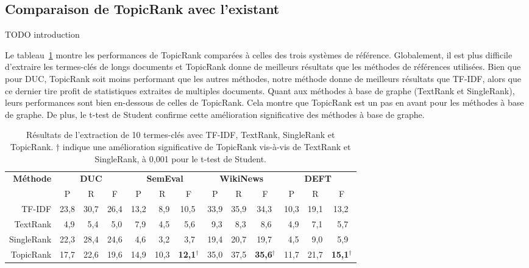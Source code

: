   \subsection{Comparaison de TopicRank avec l'existant}
  \label{subsec:comparaison_de_topicrank_avec_l_existant}
    TODO introduction

    Le tableau~\ref{tab:resultats_globaux} montre les performances de TopicRank
    comparées à celles des trois systèmes de référence.
    Globalement, il est plus difficile d'extraire les termes-clés de longs
    documents et TopicRank donne de meilleurs résultats que les méthodes de
    références utilisées.
    Bien que pour DUC, TopicRank soit moins performant que les autres méthodes,
    notre méthode donne de meilleurs résultats que TF-IDF, alors que ce dernier
    tire profit de statistiques extraites de multiples documents. Quant aux
    méthodes à base de graphe (TextRank et SingleRank), leurs performances sont
    bien en-dessous de celles de TopicRank. Cela montre que TopicRank est un pas
    en avant pour les méthodes à base de graphe. De plus, le t-test de Student
    confirme cette amélioration significative des méthodes à base de graphe.
    \begin{table}
      \centering
      \begin{tabular}{@{~}r@{~~}c@{~~}c@{~~}c@{~~}c@{~~}c@{~~}c@{~~}c@{~~}c@{~~}c@{~~}c@{~~}c@{~~}c@{~}}
        \toprule
        \multirow{2}{*}[-2pt]{\textbf{Méthode}} & \multicolumn{3}{c}{\textbf{DUC}} & \multicolumn{3}{c}{\textbf{SemEval}} & \multicolumn{3}{c}{\textbf{WikiNews}} & \multicolumn{3}{c}{\textbf{DEFT}}\\
        \cmidrule(r){2-4}\cmidrule(r){5-7}\cmidrule(r){8-10}\cmidrule{11-13}
        & P & R & F & P & R & F & P & R & F & P & R & F\\
        \midrule
        TF-IDF & 23,8 & 30,7 & 26,4 & 13,2 & $~~$8,9 & 10,5$^{~}$ & 33,9 & 35,9 & 34,3$^{~}$ & 10,3 & 19,1 & 13,2$^{~}$\\
        TextRank & $~~$4,9 & $~~$5,4 & $~~$5,0 & $~~$7,9 & $~~$4,5 & $~~$5,6$^{~}$ & $~~$9,3 & $~~$8,3 & $~~$8,6$^{~}$ & $~~$4,9 & $~~$7,1 & $~~$5,7$^{~}$\\
        SingleRank & 22,3 & 28,4 & 24,6 & $~~$4,6 & $~~$3,2 & $~~$3,7$^{~}$ & 19,4 & 20,7 & 19,7$^{~}$ & $~~$4,5 & $~~$9,0 & $~~$5,9$^{~}$\\
        TopicRank & 17,7 & 22,6 & 19,6 & 14,9 & 10,3 & \textbf{12,1}$^\dagger$ & 35,0 & 37,5 & \textbf{35,6}$^\dagger$ & 11,7 & 21,7 & \textbf{15,1}$^\dagger$\\
        \bottomrule
      \end{tabular}
      \caption{Résultats de l'extraction de 10 termes-clés avec TF-IDF,
               TextRank, SingleRank et TopicRank. $\dagger$ indique une
               amélioration significative de TopicRank vis-à-vis de TextRank et
               SingleRank, à 0,001 pour le t-test de Student.
               \label{tab:resultats_globaux}}
    \end{table}

